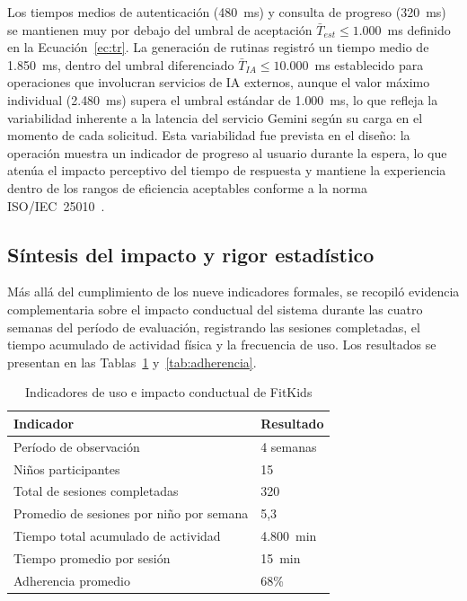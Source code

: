 				Los tiempos medios de autenticación (480~ms) y consulta de progreso (320~ms) se mantienen muy por debajo del umbral de aceptación $\bar{T}_{est} \leq 1{.}000$~ms definido en la Ecuación~\eqref{ec:tr}. La generación de rutinas registró un tiempo medio de 1{.}850~ms, dentro del umbral diferenciado $\bar{T}_{IA} \leq 10{.}000$~ms establecido para operaciones que involucran servicios de IA externos, aunque el valor máximo individual (2{.}480~ms) supera el umbral estándar de 1{.}000~ms, lo que refleja la variabilidad inherente a la latencia del servicio Gemini según su carga en el momento de cada solicitud. Esta variabilidad fue prevista en el diseño: la operación muestra un indicador de progreso al usuario durante la espera, lo que atenúa el impacto perceptivo del tiempo de respuesta y mantiene la experiencia dentro de los rangos de eficiencia aceptables conforme a la norma ISO/IEC~25010~\cite{GuerreroUlloa2024}.
				
			\subsection{Síntesis del impacto y rigor estadístico}
			\label{sec:sinimprigest}
				Más allá del cumplimiento de los nueve indicadores formales, se recopiló evidencia complementaria sobre el impacto conductual del sistema durante las cuatro semanas del período de evaluación, registrando las sesiones completadas, el tiempo acumulado de actividad física y la frecuencia de uso. Los resultados se presentan en las Tablas~\ref{tab:uso_conductual} y~\ref{tab:adherencia}.
				
				\begin{table}[H]
					\centering\small
					\caption{Indicadores de uso e impacto conductual de FitKids}
					\label{tab:uso_conductual}
					\begin{tabular}{p{8.5cm}p{5cm}}
						\hline
						\textbf{Indicador} & \textbf{Resultado}\\
						\hline
						Período de observación & 4 semanas\\
						Niños participantes & 15\\
						Total de sesiones completadas & 320\\
						Promedio de sesiones por niño por semana & 5,3\\
						Tiempo total acumulado de actividad & 4.800~min\\
						Tiempo promedio por sesión & 15~min\\
						Adherencia promedio & 68\%\\
						\hline
					\end{tabular}
				\end{table}
				\tblnote
				
